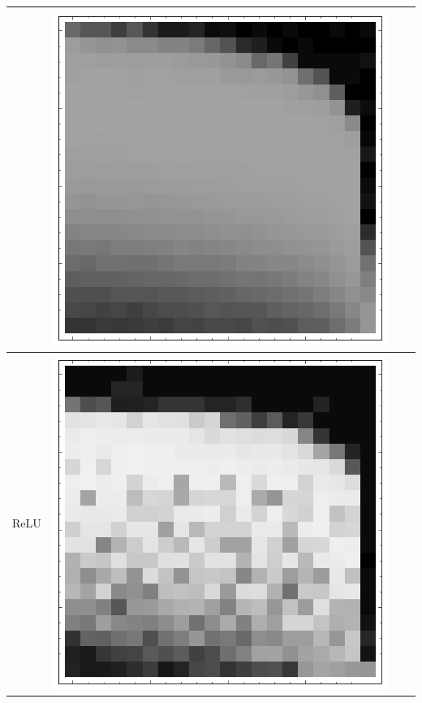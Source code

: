 \documentclass[10pt]{article}
\begin{document}
\begin{tabular}{|c|c|c|c|}
        & \includegraphics[scale=0.25]{plots/simple/LF-40T20T10T-20T10-MNIST-6.png} \\ \hline
ReLU 
        & \includegraphics[scale=0.25]{plots/simple/LF-20R10R-20T10-MNIST-6.png}

\end{tabular}
\end{document}
